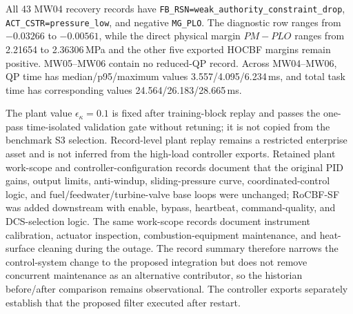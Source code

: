 \begin{table}[htbp]
    \centering
    \caption{High-load controller-export evidence. Direct margins are minima over all 1440 records in each window. ``None'' in the status column denotes no reduced-QP recovery and no saturation flag.}
    \label{tab:S_high_load}
    \scriptsize
\end{table}

All 43 MW04 recovery records have \texttt{FB\_RSN=weak\_authority\_constraint\_drop}, \texttt{ACT\_CSTR=pressure\_low}, and negative \texttt{MG\_PLO}. The diagnostic row ranges from $-0.03266$ to $-0.00561$, while the direct physical margin $PM-PLO$ ranges from 2.21654 to 2.36306\,MPa and the other five exported HOCBF margins remain positive. MW05--MW06 contain no reduced-QP record. Across MW04--MW06, QP time has median/p95/maximum values 3.557/4.095/6.234\,ms, and total task time has corresponding values 24.564/26.183/28.665\,ms.

The plant value $\epsilon_\kappa=0.1$ is fixed after training-block replay and passes the one-pass time-isolated validation gate without retuning; it is not copied from the benchmark S3 selection. Record-level plant replay remains a restricted enterprise asset and is not inferred from the high-load controller exports. Retained plant work-scope and controller-configuration records document that the original PID gains, output limits, anti-windup, sliding-pressure curve, coordinated-control logic, and fuel/feedwater/turbine-valve base loops were unchanged; RoCBF-SF was added downstream with enable, bypass, heartbeat, command-quality, and DCS-selection logic. The same work-scope records document instrument calibration, actuator inspection, combustion-equipment maintenance, and heat-surface cleaning during the outage. The record summary therefore narrows the control-system change to the proposed integration but does not remove concurrent maintenance as an alternative contributor, so the historian before/after comparison remains observational. The controller exports separately establish that the proposed filter executed after restart.

